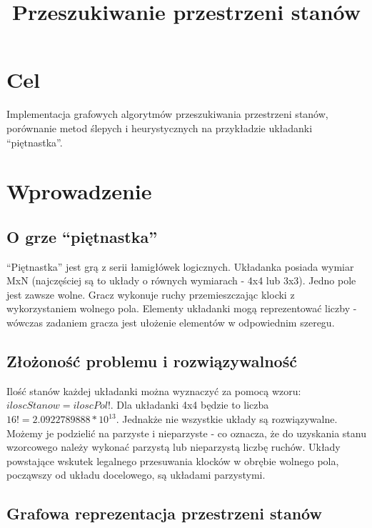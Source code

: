 \documentclass{classrep}
\author{
  \studentinfo{Marcin Pajkowski}{211968} \and
  \studentinfo{Rafał Warda}{214067}
}
\title{Przeszukiwanie przestrzeni stanów}
\begin{document}
\begin{titlepage}
  \maketitle
  \thispagestyle{empty}
\end{titlepage}

\section{Cel}

Implementacja grafowych algorytmów przeszukiwania przestrzeni stanów,
porównanie metod ślepych i heurystycznych na przykładzie układanki
``piętnastka''.

\section{Wprowadzenie}

\subsection{O grze ``piętnastka''}

``Piętnastka'' jest grą z serii łamigłówek logicznych. Układanka posiada
wymiar MxN (najczęściej są to układy o równych wymiarach - 4x4 lub 3x3).
Jedno pole jest zawsze wolne. Gracz wykonuje ruchy przemieszczając
klocki z wykorzystaniem wolnego pola. Elementy układanki mogą
reprezentować liczby - wówczas zadaniem gracza jest ułożenie elementów w
odpowiednim szeregu.

\subsection{Złożoność problemu i rozwiązywalność}

Ilość stanów każdej układanki można wyznaczyć za pomocą wzoru:
$ iloscStanow = iloscPol! $. Dla układanki 4x4 będzie to liczba
$ 16! = 2.0922789888 * 10^{13} $. Jednakże nie wszystkie układy są
rozwiązywalne. Możemy je podzielić na parzyste i nieparzyste - co
oznacza, że do uzyskania stanu wzorcowego należy wykonać parzystą lub
nieparzystą liczbę ruchów. Układy powstające wskutek legalnego
przesuwania klocków w obrębie wolnego pola, począwszy od układu
docelowego, są układami parzystymi.

\subsection{Grafowa reprezentacja przestrzeni stanów}
\end{document}
